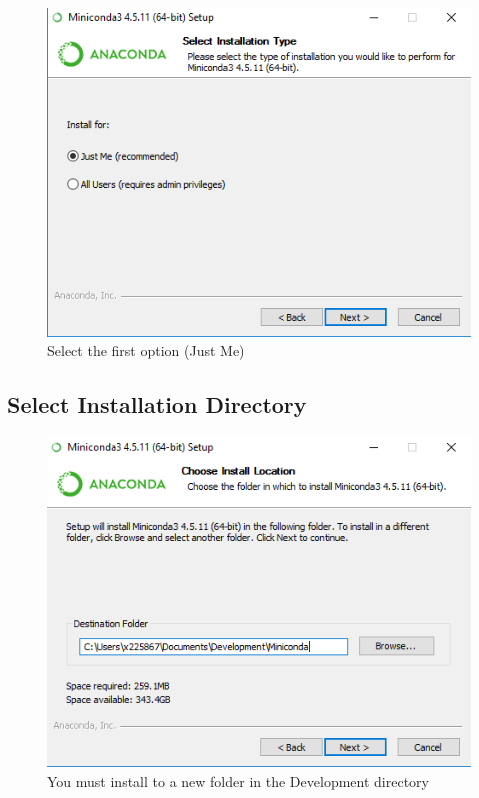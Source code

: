 \documentclass{report}
\begin{document}
\begin{figure}[H]
\centering
\includegraphics{./images/Just_Me.PNG}
\caption{Select the first option (Just Me)}
\end{figure}

\subsection*{Select Installation Directory}

\begin{figure}[H]
\centering
\includegraphics{./images/Installation_Directory.PNG}
\caption{You must install to a new folder in the Development directory}
\end{figure}
\end{document}

